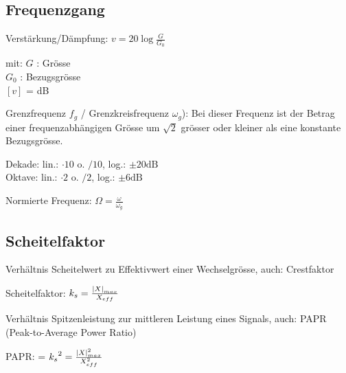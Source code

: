 \begin{sectionbox}
	\subsection{Frequenzgang}
	\begin{emphbox}
		Verstärkung/Dämpfung: $v = 20\log \frac{G}{G_0}$
	\end{emphbox}
	mit:
	$G$ : Grösse\\
	$G_0$ : Bezugsgrösse\\
	$[v]$ = dB
	
	Grenzfrequenz $f_g$ / Grenzkreisfrequenz $\omega_g$):
	Bei dieser Frequenz ist der Betrag einer frequenzabhängigen Grösse	um $\sqrt{2}$ grösser oder kleiner als eine konstante Bezugsgrösse.
	
	
	Dekade: lin.: $\cdot 10$ o. $/10$, log.: $\pm 20 \si{\dB}$\\
	Oktave:	lin.: $\cdot 2$ o. $/2$, log.: $\pm 6 \si{\dB}$
	\begin{emphbox}
		Normierte Frequenz: $\Omega = \frac{\omega}{\omega_g}$
	\end{emphbox}

\end{sectionbox}

\begin{sectionbox}
	
	\subsection{Scheitelfaktor}
	Verhältnis Scheitelwert zu Effektivwert einer Wechselgrösse, auch: Crestfaktor
	\begin{emphbox}
		Scheitelfaktor: $k_s = \frac{\left\vert X\right\vert_{max}}{X_{eff}}$
	\end{emphbox}

	Verhältnis Spitzenleistung zur mittleren Leistung eines Signals, auch: PAPR (Peak-to-Average Power Ratio)

	\begin{emphbox}
		PAPR: = $ {k_s}^2 = \frac{\left\vert X\right\vert^2_{max}}{X^2_{eff}} $ 
	\end{emphbox}
\end{sectionbox}


